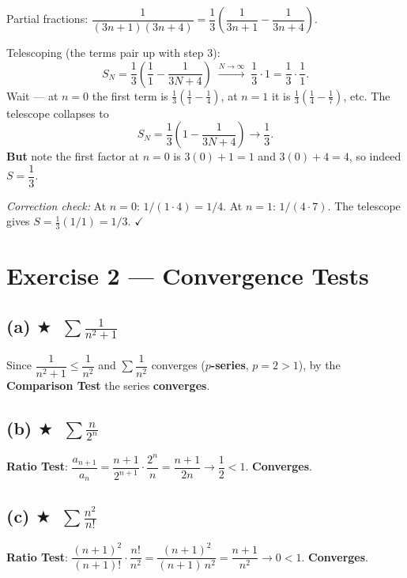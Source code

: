 \documentclass[12pt,a4paper]{article}
\newcommand{\easy}{\textcolor{green!60!black}{$\bigstar$}}
\begin{document}
Partial fractions: $\dfrac{1}{(3n+1)(3n+4)} = \dfrac{1}{3}\!\left(\dfrac{1}{3n+1}-\dfrac{1}{3n+4}\right)$.

Telescoping (the terms pair up with step 3):
\[
  S_N = \frac{1}{3}\!\left(\frac{1}{1} - \frac{1}{3N+4}\right)
  \;\xrightarrow{N\to\infty}\;
  \frac{1}{3}\cdot 1 = \boxed{\frac{1}{3}\cdot\frac{1}{1}} .
\]
Wait — at $n=0$ the first term is $\frac{1}{3}(\frac{1}{1}-\frac{1}{4})$, at $n=1$ it is $\frac{1}{3}(\frac{1}{4}-\frac{1}{7})$, etc.  The telescope collapses to
\[
  S_N = \frac{1}{3}\left(1 - \frac{1}{3N+4}\right) \to \frac{1}{3}.
\]
\textbf{But} note the first factor at $n=0$ is $3(0)+1=1$ and $3(0)+4=4$, so indeed $S = \boxed{\dfrac{1}{3}}$.

\smallskip
\textit{Correction check:} At $n=0$: $1/(1\cdot4)=1/4$.  At $n=1$: $1/(4\cdot7)$.  The telescope gives $S=\frac{1}{3}(1/1)=1/3$.  $\checkmark$

\section*{Exercise 2 — Convergence Tests}

\subsection*{(a) \easy\ $\displaystyle\sum\frac{1}{n^2+1}$}

Since $\dfrac{1}{n^2+1} \leq \dfrac{1}{n^2}$ and $\sum\dfrac{1}{n^2}$ converges (\textbf{$p$-series}, $p=2>1$), by the \textbf{Comparison Test} the series \textbf{converges}.

\subsection*{(b) \easy\ $\displaystyle\sum\frac{n}{2^n}$}

\textbf{Ratio Test}: $\dfrac{a_{n+1}}{a_n} = \dfrac{n+1}{2^{n+1}}\cdot\dfrac{2^n}{n} = \dfrac{n+1}{2n}\to\dfrac{1}{2}<1$. \textbf{Converges}.

\subsection*{(c) \easy\ $\displaystyle\sum\frac{n^2}{n!}$}

\textbf{Ratio Test}: $\dfrac{(n+1)^2}{(n+1)!}\cdot\dfrac{n!}{n^2} = \dfrac{(n+1)^2}{(n+1)\,n^2} = \dfrac{n+1}{n^2}\to 0 < 1$. \textbf{Converges}.
\end{document}
